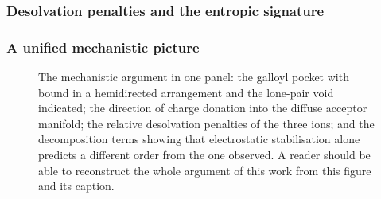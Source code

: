 \subsubsection{Desolvation penalties and the entropic signature}
\label{sec:results-desolvation}

\begin{table}[htbp]
  \centering
  \caption[Hydration free energies, sources and conventions]{Hydration free energies used in the desolvation argument, with the source and the convention or scale stated for each. Absolute single-ion hydration free energies are convention-dependent; the argument is therefore made on \emph{relative} values, for which the convention cancels.}
  \label{tab:hydration}
\end{table}

\subsubsection{A unified mechanistic picture}
\label{sec:results-unified}

\begin{figure}[htbp]
  \centering
  \caption[The mechanistic argument in one panel]{The mechanistic argument in one panel: the galloyl pocket with \PbII{} bound in a hemidirected arrangement and the lone-pair void indicated; the direction of charge donation into the diffuse acceptor manifold; the relative desolvation penalties of the three ions; and the decomposition terms showing that electrostatic stabilisation alone predicts a different order from the one observed. A reader should be able to reconstruct the whole argument of this work from this figure and its caption.}
  \label{fig:master-mechanism}
\end{figure}


